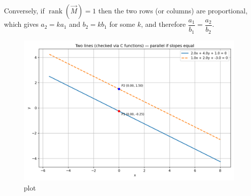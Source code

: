 \documentclass[journal]{IEEEtran}
\begin{document}
Conversely, if \(\operatorname{rank}(\vec{M})=1\) then the two rows (or columns) are proportional, which gives \(a_2 = k a_1\) and \(b_2 = k b_1\) for some \(k\), and therefore \(\dfrac{a_1}{b_1}=\dfrac{a_2}{b_2}\).

\begin{figure}[H]
\centering
\includegraphics[width=0.75\columnwidth]{figs/5.png}
\caption{\centering plot}
\label{fig:placeholder_125}
\end{figure}
\end{document}
